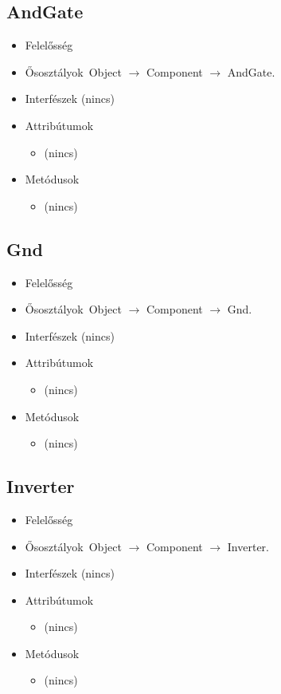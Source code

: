 \subsection{AndGate}
\begin{itemize}
\item Felelősség\\

\item Ősosztályok\ Object $\rightarrow{}$ Component $\rightarrow{}$ AndGate.
\item Interfészek (nincs)
\item Attribútumok $\ $
\begin{itemize}
\item (nincs)
\end{itemize}
\item Metódusok$\ $
\begin{itemize}
\item (nincs)
\end{itemize}
\end{itemize}

\subsection{Gnd}
\begin{itemize}
\item Felelősség\\

\item Ősosztályok\ Object $\rightarrow{}$ Component $\rightarrow{}$ Gnd.
\item Interfészek (nincs)
\item Attribútumok $\ $
\begin{itemize}
\item (nincs)
\end{itemize}
\item Metódusok$\ $
\begin{itemize}
\item (nincs)
\end{itemize}
\end{itemize}

\subsection{Inverter}
\begin{itemize}
\item Felelősség\\

\item Ősosztályok\ Object $\rightarrow{}$ Component $\rightarrow{}$ Inverter.
\item Interfészek (nincs)
\item Attribútumok $\ $
\begin{itemize}
\item (nincs)
\end{itemize}
\item Metódusok$\ $
\begin{itemize}
\item (nincs)
\end{itemize}
\end{itemize}

